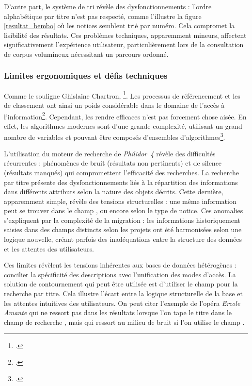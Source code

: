 D'autre part, le système de tri révèle des dysfonctionnements : l'ordre alphabétique par titre n'est pas respecté, comme l'illustre la figure \ref{resultat_bembo} où les notices semblent trié par numéro. Cela compromet la lisibilité des résultats. Ces problèmes techniques, apparemment mineurs, affectent significativement l'expérience utilisateur, particulièrement lors de la consultation de corpus volumineux nécessitant un parcours ordonné.

\subsubsection{Limites ergonomiques et défis techniques}

Comme le souligne Ghislaine Chartron, \footcite{chartronEditionPublicationContenus2016}. Les processus de référencement et les  de classement ont ainsi un poids considérable dans le domaine de l'accès à l'information\footcite{chartronEditionPublicationContenus2016}. Cependant, les rendre efficaces n'est pas forcement chose aisée. En effet, les algorithmes modernes sont d'une grande complexité, utilisant un grand nombre de variables et pouvant être composés d'ensembles d'algorithmes\footcite{richardDansBoiteNoire2018a}.

L'utilisation du moteur de recherche de \textit{Philidor~4} révèle des difficultés récurrentes : phénomènes de bruit (résultats non pertinents) et de silence (résultats manqués) qui compromettent l'efficacité des recherches. La recherche par titre présente des dysfonctionnements liés à la répartition des informations dans différents attributs selon la nature des objets décrits. Cette dernière, apparemment simple, révèle des tensions structurelles : une même information peut se trouver dans le champ ,  ou encore  selon le type de notice. Ces anomalies s'expliquent par la complexité de la migration : les informations historiquement saisies dans des champs distincts selon les projets ont été harmonisées selon une logique nouvelle, créant parfois des inadéquations entre la structure des données et les attentes des utilisateurs.

Ces limites révèlent les tensions inhérentes aux bases de données hétérogènes : concilier la spécificité des descriptions avec l'unification des modes d'accès. La solution de contournement qui peut être utilisée est d'utiliser le champ  pour la recherche par titre. Cela illustre l'écart entre la logique structurelle de la base et les attentes intuitives des utilisateurs. On peut citer l'exemple de l'opéra \textit{Ercole Amante} qui ne ressort pas dans les résultats lorsque l'on tape le titre dans le champ de recherche , mais qui ressort au milieu de bruit si l'on utilise le champ .


